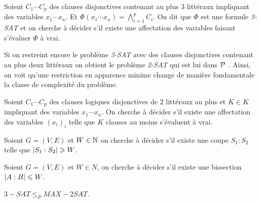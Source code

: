 \documentclass{standalone}
\begin{document}
\begin{defn}
	Soient $C_1 \cdots C_p$ des clauses disjonctives contenant au plus 3 littéraux impliquant des variables $x_1 \cdots x_n$.
	Et $\Phi(x_1 \cdots x_n) =\bigwedge_{i = 1}^p C_i$.
	On dit que $\Phi$ est une formule \textit{3-SAT} et on cherche à décider s'il existe une affectation des variables faisant s'évaluer $\Phi$ à vrai.
\end{defn}

\begin{rem}
	Si on restreint encore le problème \textit{3-SAT} avec des clauses disjonctives contenant au plus deux littéraux on obtient le problème \textit{2-SAT} qui est lui dans $\mathcal{P}$ \cite{sat}. Ainsi, on voit qu'une restriction en apparence minime change de manière fondamentale la classe de complexité du problème.
\end{rem}

\begin{defn}
	Soient $C_1 \cdots C_p$ des clauses logiques disjonctives de $2$ littéraux au plus et $K\in K$ impliquant des variables $x_1 \cdots x_n$. On cherche à décider s'il existe une affectation des variables $(x_i)_i$ telle que $K$ clauses au moins s'évaluent à vrai.
\end{defn}

\begin{defn}
	Soient $G=(V,E)$ et $W \in \mathbb{N}$ on cherche à décider s'il existe une coupe $S_1:S_2$ telle que $\left| S_1:S_2\right| \geqslant W$.	
\end{defn}

\begin{defn}
	Soient $G=(V, E)$ et $W \in N$, on cherche à décider s'il existe une bissection $\left| A:B\right| \leqslant W$.
\end{defn}

\begin{thm}
	 $3-SAT \leq_P MAX-2SAT$.
\end{thm}
\end{document}
